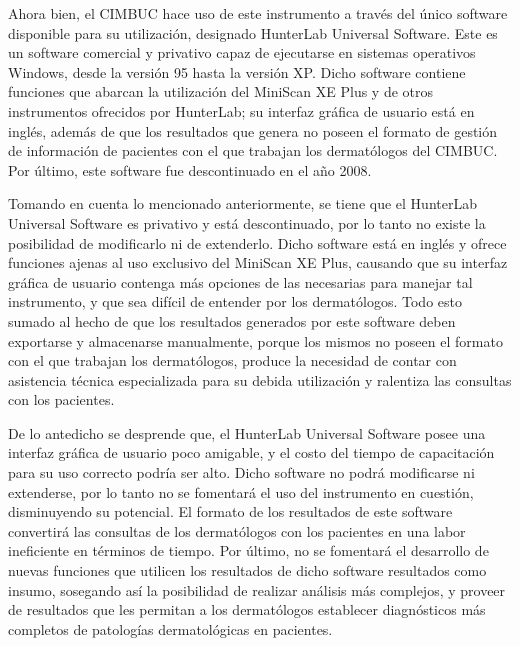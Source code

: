 Ahora bien, el CIMBUC hace uso de este instrumento a trav\'{e}s del \'{u}nico software disponible para su utilizaci\'{o}n, designado HunterLab Universal Software. Este es un software comercial y privativo capaz de ejecutarse en sistemas operativos Windows, desde la versi\'{o}n 95 hasta la versi\'{o}n XP. Dicho software contiene funciones que abarcan la utilizaci\'{o}n del MiniScan XE Plus y de otros instrumentos ofrecidos por HunterLab; su interfaz gr\'{a}fica de usuario est\'{a} en ingl\'{e}s, adem\'{a}s de que los resultados que genera no poseen el formato de gesti\'{o}n de informaci\'{o}n de pacientes con el que trabajan los dermat\'{o}logos del CIMBUC. Por \'{u}ltimo, este software fue descontinuado en el a\~{n}o 2008.

Tomando en cuenta lo mencionado anteriormente, se tiene que el HunterLab Universal Software es privativo y est\'{a} descontinuado, por lo tanto no existe la posibilidad de modificarlo ni de extenderlo. Dicho software est\'{a} en ingl\'{e}s y ofrece funciones ajenas al uso exclusivo del MiniScan XE Plus, causando que su interfaz gr\'{a}fica de usuario contenga m\'{a}s opciones de las necesarias para manejar tal instrumento, y que sea dif\'{i}cil de entender por los dermat\'{o}logos. Todo esto sumado al hecho de que los resultados generados por este software deben exportarse y almacenarse manualmente, porque los mismos no poseen el formato con el que trabajan los dermat\'{o}logos, produce la necesidad de contar con asistencia t\'{e}cnica especializada para su debida utilizaci\'{o}n y ralentiza las consultas con los pacientes.

De lo antedicho se desprende que, el HunterLab Universal Software posee una interfaz gr\'{a}fica de usuario poco amigable, y el costo del tiempo de capacitaci\'{o}n para su uso correcto podr\'{i}a ser alto. Dicho software no podr\'{a} modificarse ni extenderse, por lo tanto no se fomentar\'{a} el uso del instrumento en cuesti\'{o}n, disminuyendo su potencial. El formato de los resultados de este software convertir\'{a} las consultas de los dermat\'{o}logos con los pacientes en una labor ineficiente en t\'{e}rminos de tiempo. Por \'{u}ltimo, no se fomentar\'{a} el desarrollo de nuevas funciones que utilicen los resultados de dicho software resultados como insumo, sosegando as\'{i} la posibilidad de realizar an\'{a}lisis m\'{a}s complejos, y proveer de resultados que les permitan a los dermat\'{o}logos establecer diagn\'{o}sticos m\'{a}s completos de patolog\'{i}as dermatol\'{o}gicas en pacientes.

